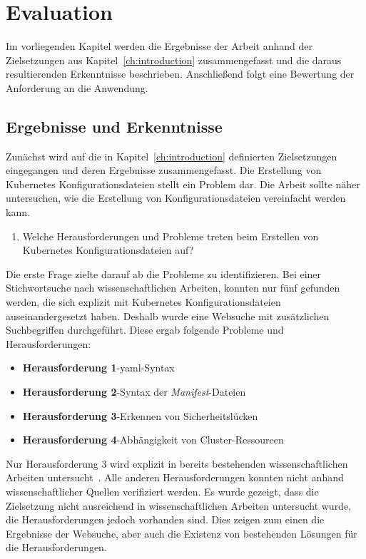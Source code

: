 \chapter{Evaluation}\label{ch:evaluation}

Im vorliegenden Kapitel werden die Ergebnisse der Arbeit anhand der Zielsetzungen aus Kapitel~\ref{ch:introduction} zusammengefasst
und die daraus resultierenden Erkenntnisse beschrieben. Anschließend folgt eine Bewertung der Anforderung an die Anwendung.

\section{Ergebnisse und Erkenntnisse}

Zunächst wird auf die in Kapitel~\ref{ch:introduction} definierten Zielsetzungen eingegangen und deren Ergebnisse zusammengefasst.
Die Erstellung von Kubernetes Konfigurationsdateien stellt ein Problem dar.
Die Arbeit sollte näher untersuchen, wie die Erstellung von Konfigurationsdateien vereinfacht werden kann.

\begin{enumerate}
    \item Welche Herausforderungen und Probleme treten beim Erstellen von Kubernetes Konfigurationsdateien auf?
\end{enumerate}
Die erste Frage zielte darauf ab die Probleme zu identifizieren. Bei einer Stichwortsuche nach wissenschaftlichen Arbeiten, konnten nur
fünf gefunden werden, die sich explizit mit Kubernetes Konfigurationsdateien
auseinandergesetzt haben.
Deshalb wurde eine Websuche mit zusätzlichen Suchbegriffen durchgeführt.
Diese ergab folgende Probleme und Herausforderungen:

\begin{itemize}
    \setlength\itemsep{-0.5cm}
    \item \textbf{Herausforderung 1}-\ac{yaml}-Syntax
    \item \textbf{Herausforderung 2}-Syntax der \textit{Manifest}-Dateien
    \item \textbf{Herausforderung 3}-Erkennen von Sicherheitslücken
    \item \textbf{Herausforderung 4}-Abhängigkeit von Cluster-Ressourcen
\end{itemize}
Nur Herausforderung 3 wird explizit in bereits bestehenden wissenschaftlichen Arbeiten untersucht~\cite{9476056,10.1145/3579639,10.1145/3468264.3473495}.
Alle anderen Herausforderungen konnten nicht anhand wissenschaftlicher Quellen verifiziert werden.
Es wurde gezeigt, dass die Zielsetzung nicht ausreichend in wissenschaftlichen Arbeiten untersucht wurde, die Herausforderungen jedoch vorhanden sind.
Dies zeigen zum einen die Ergebnisse der Websuche, aber auch die Existenz von bestehenden Lösungen für die Herausforderungen.


